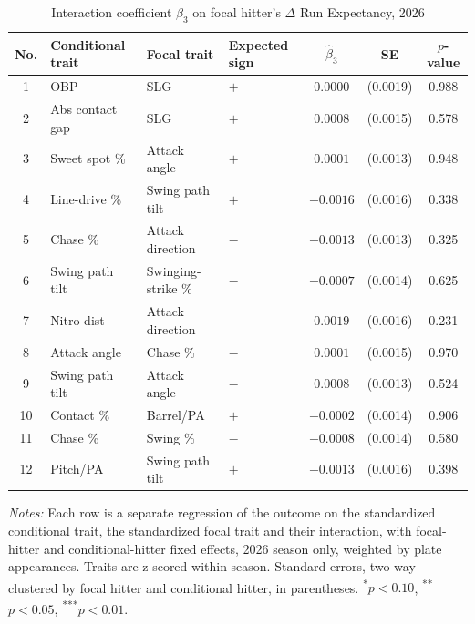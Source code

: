 \begin{table}[htbp]
\centering
\small
\caption{Interaction coefficient $\beta_3$ on focal hitter's $\Delta$ Run Expectancy, 2026}
\label{tab:table1_focal_2026}
\begin{tabular}{clllccc}
\toprule
No. & Conditional trait & Focal trait & Expected sign & $\hat\beta_3$ & SE & $p$-value \\
\midrule
1 & OBP & SLG & $+$ & $0.0000$ & (0.0019) & 0.988 \\
2 & Abs contact gap & SLG & $+$ & $0.0008$ & (0.0015) & 0.578 \\
3 & Sweet spot \% & Attack angle & $+$ & $0.0001$ & (0.0013) & 0.948 \\
4 & Line-drive \% & Swing path tilt & $+$ & $-0.0016$ & (0.0016) & 0.338 \\
5 & Chase \% & Attack direction & $-$ & $-0.0013$ & (0.0013) & 0.325 \\
6 & Swing path tilt & Swinging-strike \% & $-$ & $-0.0007$ & (0.0014) & 0.625 \\
7 & Nitro dist & Attack direction & $-$ & $0.0019$ & (0.0016) & 0.231 \\
8 & Attack angle & Chase \% & $-$ & $0.0001$ & (0.0015) & 0.970 \\
9 & Swing path tilt & Attack angle & $-$ & $0.0008$ & (0.0013) & 0.524 \\
10 & Contact \% & Barrel/PA & $+$ & $-0.0002$ & (0.0014) & 0.906 \\
11 & Chase \% & Swing \% & $-$ & $-0.0008$ & (0.0014) & 0.580 \\
12 & Pitch/PA & Swing path tilt & $+$ & $-0.0013$ & (0.0016) & 0.398 \\
\bottomrule
\end{tabular}
\par\smallskip\parbox{0.95\textwidth}{\footnotesize \textit{Notes:} Each row is a separate regression of the outcome on the standardized conditional trait, the standardized focal trait and their interaction, with focal-hitter and conditional-hitter fixed effects, 2026 season only, weighted by plate appearances. Traits are z-scored within season. Standard errors, two-way clustered by focal hitter and conditional hitter, in parentheses. \textsuperscript{*}$p<0.10$, \textsuperscript{**}$p<0.05$, \textsuperscript{***}$p<0.01$.}
\end{table}
